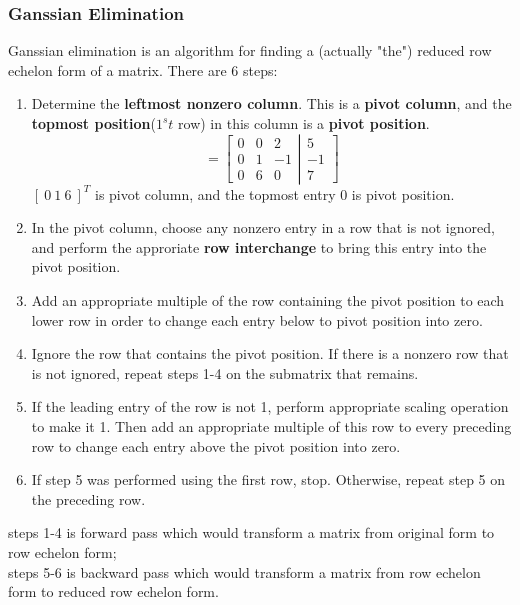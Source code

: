 \documentclass[14pt]{article}
\begin{document}
\begin{CJK}{UTF8}{min}
\subsubsection{Ganssian Elimination}
Ganssian elimination is an algorithm for finding a (actually "the") reduced row echelon form of a matrix.
There are 6 steps:
\begin{enumerate}
\item Determine the \textbf{leftmost nonzero column}. This is a \textbf{pivot column}, and the \textbf{topmost position}($1^st$ row) in this column is a \textbf{pivot position}.
\begin{equation}
[\ A\ |\ \underline{b}\ ]=\left[
\begin{array}{ccc}
0 & 0 & 2\\
0 & 1 & -1\\
0 & 6 & 0
\end{array}
\right|\left.
\begin{array}{c}
5\\
-1\\
7
\end{array}
\right]
\end{equation}
$[\ 0\ 1\ 6\ ]^T$ is pivot column, and the topmost entry $0$ is pivot position.
\item In the pivot column, choose any nonzero entry in a row that is not ignored, and perform the approriate \textbf{row interchange} to bring this entry into the pivot position.
\item Add an appropriate multiple of the row containing the pivot position to each lower row in order to change each entry below to pivot position into zero.
\item Ignore the row that contains the pivot position. If there is a nonzero row that is not ignored, repeat steps 1-4 on the submatrix that remains.
\item If the leading entry of the row is not 1, perform appropriate scaling operation to make it 1. Then add an appropriate multiple of this row to every preceding row to change each entry above the pivot position into zero.
\item If step 5 was performed using the first row, stop. Otherwise, repeat step 5 on the preceding row.
\end{enumerate}
steps 1-4 is forward pass which would transform a matrix from original form to row echelon form;\\
steps 5-6 is backward pass which would transform a matrix from row echelon form to reduced row echelon form.\\


\end{CJK}
\end{document}
